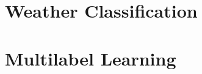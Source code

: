 \documentclass[a4paper, 11pt, oneside]{Thesis}  %
\begin{document}



\clearpage
\part{Weather Classification}
\maketitle

\mainmatter	  %
\pagestyle{fancy}  %





\clearpage
\part{Multilabel Learning}
\maketitle






\end{document}
